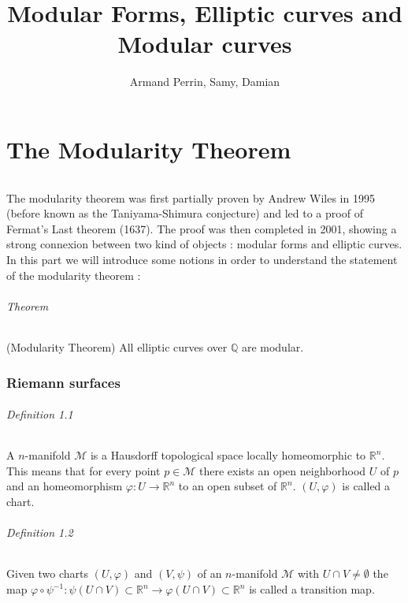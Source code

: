 \documentclass[letterpaper,10pt]{article}
\title{Modular Forms, Elliptic curves and Modular curves}
\author{Armand Perrin, Samy, Damian}
\begin{document}
\maketitle%

\newcommand{\C}{\ensuremath{\mathbb{C}}}
\newcommand{\Z}{\ensuremath{\mathbb{Z}}}

\newcommand{\SL}{\ensuremath{SL_2(\mathbb{Z})}}

\part{The Modularity Theorem}

\paragraph{}The modularity theorem was first partially proven by Andrew Wiles in 1995 (before known as the Taniyama-Shimura conjecture) 
and led to a proof of Fermat's Last theorem (1637). The proof was then completed in 2001, showing a strong connexion between 
two kind of objects : modular forms and elliptic curves. In this part we will introduce some notions in order to understand 
the statement of the modularity theorem : 

\paragraph{Theorem } (Modularity Theorem) All elliptic curves over $\mathbb{Q}$ are modular.



\section{Riemann surfaces}%

\paragraph{Definition 1.1} A $n$-manifold $\mathcal{M}$ is a Hausdorff topological space locally homeomorphic to $\mathbb{R}^n$.
This means that for every point $p \in \mathcal{M}$ there exists an open neighborhood $U$ of $p$ and an homeomorphism $\varphi : U \to \mathbb{R}^n$ to an open subset
of $\mathbb{R}^n$. $(U,\varphi)$ is called a chart.


\paragraph{Definition 1.2} Given two charts $(U,\varphi)$ and $(V,\psi)$ of an $n$-manifold $\mathcal{M}$ with $U\cap V \neq \emptyset$ the map
$\varphi \circ \psi^{-1} : \psi(U\cap V) \subset \mathbb{R}^n \to \varphi(U\cap V) \subset \mathbb{R}^n$ is called a transition map.
\end{document}
